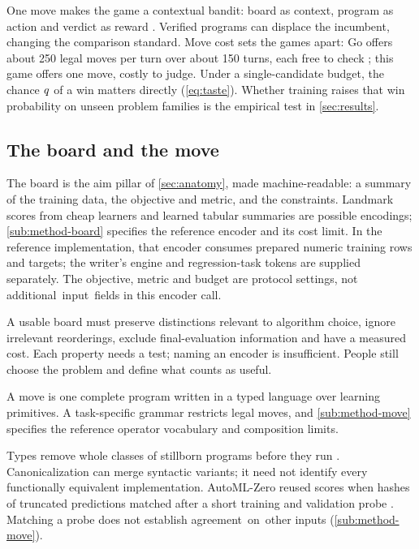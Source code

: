 One move makes the game a contextual bandit: board as context, program as
action and verdict as reward \citep{lattimore2020bandit}. Verified programs
can displace the incumbent, changing the comparison standard. Move cost
sets the games apart: Go offers about 250 legal moves per turn over about
150 turns, each free to check \citep{silver2016mastering}; this game offers
one move, costly to judge. Under a single-candidate budget, the chance $q$ of a win matters
directly (\cref{eq:taste}). Whether training raises that win probability on unseen
problem families is the empirical test in \cref{sec:results}.

\subsection{The board and the move}\label{sub:game-board}

The board is the aim pillar of \cref{sec:anatomy}, made machine-readable: a
summary of the training data, the objective and metric, and the constraints.
Landmark scores from cheap learners \citep{pfahringer2000landmarking} and
learned tabular summaries are possible encodings; \cref{sub:method-board}
specifies the reference encoder and its cost limit.
In the reference implementation, that encoder consumes prepared numeric training
rows and targets; the writer's engine and regression-task tokens are
supplied separately. The objective, metric and budget are protocol
settings, not \mbox{additional input fields} in this encoder call.

A usable board must preserve distinctions relevant to algorithm choice,
ignore irrelevant reorderings, exclude final-evaluation information and
have a measured cost. Each property needs a test; naming an encoder is
insufficient. People still choose the problem and define what counts
as useful.

A move is one complete program written in a typed language over learning primitives.
A task-specific grammar restricts legal moves, and \cref{sub:method-move}
specifies the reference operator vocabulary and composition limits.

Types remove whole classes of stillborn
programs before they run \citep{montana1995stgp}. Canonicalization can merge
syntactic variants; it need not identify every functionally equivalent
implementation. AutoML-Zero
reused scores when hashes of truncated predictions matched after a short
training and validation probe \citep{real2020automlzero}. Matching a probe
does not establish \mbox{agreement on other} inputs (\cref{sub:method-move}).


